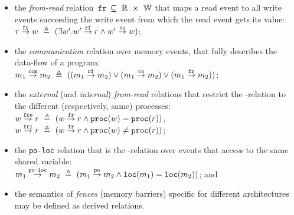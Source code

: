 \begin{itemize}

    \item the \textit{from-read} relation $\,\texttt{fr}\, \subseteq~\mathbb{R}~\times~\mathbb{W}$ that maps a read event to all write events succeeding the write event from which the read event gets its value: \\
    $r \overset{\texttt{fr}}{\rightarrow} w ~\triangleq~ (\exists w' . w' \overset{\texttt{rf}}{\rightarrow} r \land w' \overset{\texttt{co}}{\rightarrow} w)$;


    \item the \textit{communication} relation \com over memory events, that fully describes the data-flow of a program: \\
    $m_1 \overset{\texttt{com}}{\rightarrow} m_2~\triangleq~((m_1\overset{\texttt{rf}}{\rightarrow}m_2) \lor (m_1\overset{\texttt{co}}{\rightarrow}m_2) \lor (m_1\overset{\texttt{fr}}{\rightarrow}m_2))$;

    \item the \textit{external} (and \textit{internal}) \textit{from-read} relations that restrict the \fr-relation to the different (respectively, same) processes: \\
    $w \overset{\texttt{fre}}{\rightarrow} r ~\triangleq~ (w \overset{\texttt{fr}}{\rightarrow} r \land \texttt{proc}(w) = \texttt{proc}(r))$, \\
    $w \overset{\texttt{fri}}{\rightarrow} r ~\triangleq~ (w \overset{\texttt{fr}}{\rightarrow} r \land \texttt{proc}(w) \neq \texttt{proc}(r))$;
    
    \item the \texttt{po-loc} relation that is the \po-relation over events that access to the same shared variable: \\
    $m_1 \overset{\texttt{po-loc}}{\rightarrow} m_2 ~\triangleq~ (m_1 \overset{\texttt{po}}{\rightarrow} m_2 \land \texttt{loc}(m_1) = \texttt{loc}(m_2))$; and

    \item the semantics of \textit{fences} (memory barriers) specific for different architectures may be defined as derived relations.


\end{itemize}

